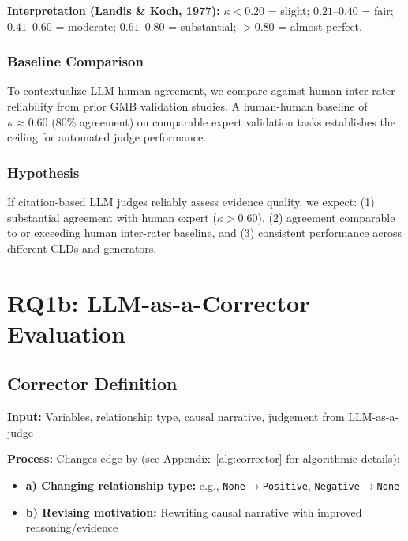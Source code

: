 \textbf{Interpretation (Landis \& Koch, 1977):} $\kappa < 0.20$ = slight; $0.21$--$0.40$ = fair; $0.41$--$0.60$ = moderate; $0.61$--$0.80$ = substantial; $> 0.80$ = almost perfect.

\subsubsection{Baseline Comparison}

To contextualize LLM-human agreement, we compare against human inter-rater reliability from prior GMB validation studies. A human-human baseline of $\kappa \approx 0.60$ (80\% agreement) on comparable expert validation tasks establishes the ceiling for automated judge performance.

\subsubsection{Hypothesis}

If citation-based LLM judges reliably assess evidence quality, we expect: (1) substantial agreement with human expert ($\kappa > 0.60$), (2) agreement comparable to or exceeding human inter-rater baseline, and (3) consistent performance across different CLDs and generators.

\section{RQ1b: LLM-as-a-Corrector Evaluation}

\subsection{Corrector Definition}
\textbf{Input:} Variables, relationship type, causal narrative, judgement from LLM-as-a-judge

\textbf{Process:} Changes edge by (see Appendix~\ref{alg:corrector} for algorithmic details):
\begin{itemize}[noitemsep]
    \item \textbf{a) Changing relationship type:} e.g., \texttt{None}$\rightarrow$\texttt{Positive}, \texttt{Negative}$\rightarrow$\texttt{None}
    \item \textbf{b) Revising motivation:} Rewriting causal narrative with improved reasoning/evidence
\end{itemize}

